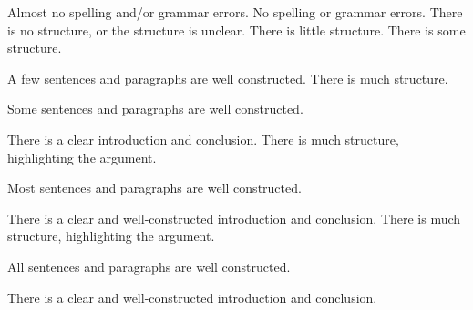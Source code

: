 \documentclass{../fal_assignment}
\begin{document}
\begin{markingrubric}
        \grade 		Almost no spelling and/or grammar errors.
        \grade 		No spelling or grammar errors.
%
        \grade\fail 	There is no structure, or the structure is unclear.
        \grade 		There is little structure.
        \grade 		There is some structure.
        \par 		A few sentences and paragraphs are well constructed.
        \grade 		There is much structure.
        \par 		Some sentences and paragraphs are well constructed.
        \par 		There is a clear introduction and conclusion.
        \grade 		There is much structure, highlighting the argument.
        \par 		Most sentences and paragraphs are well constructed.
        \par 		There is a clear and well-constructed introduction and conclusion.
        \grade 		There is much structure, highlighting the argument.
        \par 		All sentences and paragraphs are well constructed.
        \par 		There is a clear and well-constructed introduction and conclusion.
\end{markingrubric}
\end{document}
